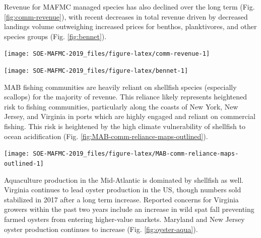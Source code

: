 \documentclass[10pt,]{article}
\let\origfigure\figure
\let\endorigfigure\endfigure
\renewenvironment{figure}[1][2] {
    \expandafter\origfigure\expandafter[H]
} {
    \endorigfigure
}
\begin{document}
Revenue for MAFMC managed species has also declined over the long term
(Fig. \ref{fig:comm-revenue}), with recent decreases in total revenue
driven by decreased landings volume outweighing increased prices for
benthos, planktivores, and other species groups (Fig. \ref{fig:bennet}).

\begin{figure}

{\centering \texttt{[image: SOE-MAFMC-2019\_files/figure-latex/comm-revenue-1]} 

}

\caption{Total revenue for the region (black) and revenue from MAFMC managed species (red).}\label{fig:comm-revenue}
\end{figure}

\begin{figure}

{\centering \texttt{[image: SOE-MAFMC-2019\_files/figure-latex/bennet-1]} 

}

\caption{Revenue change from the long-term mean in 2015 dollars (black), Price (PI), and Volume Indicators (VI) for commercial landings in the Mid-Atlantic.}\label{fig:bennet}
\end{figure}

MAB fishing communities are heavily reliant on shellfish species
(especially scallops) for the majority of revenue. This reliance likely
represents heightened risk to fishing communities, particularly along
the coasts of New York, New Jersey, and Virginia in ports which are
highly engaged and reliant on commercial fishing. This risk is
heightened by the high climate vulnerability of shellfish to ocean
acidification (Fig. \ref{fig:MAB-comm-reliance-maps-outlined}).

\begin{figure}

{\centering \texttt{[image: SOE-MAFMC-2019\_files/figure-latex/MAB-comm-reliance-maps-outlined-1]} 

}

\caption{Commercial engagement (total pounds landed, value landed, commercial permits and commercial dealers in a community) and reliance (per capita engagement) based on 2016 landings and the ACS running average of 2012-2016 census data.}\label{fig:MAB-comm-reliance-maps-outlined}
\end{figure}

Aquaculture production in the Mid-Atlantic is dominated by shellfish as
well. Virginia continues to lead oyster production in the US, though
numbers sold stabilized in 2017 after a long term increase. Reported
concerns for Virginia growers within the past two years include an
increase in wild spat fall preventing farmed oysters from entering
higher-value markets. Maryland and New Jersey oyster production
continues to increase (Fig. \ref{fig:oyster-aqua}).
\end{document}
